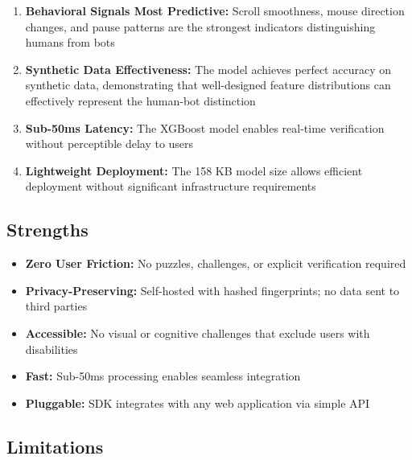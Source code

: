 \begin{enumerate}
    \item \textbf{Behavioral Signals Most Predictive:} Scroll smoothness, mouse direction changes, and pause patterns are the strongest indicators distinguishing humans from bots
    
    \item \textbf{Synthetic Data Effectiveness:} The model achieves perfect accuracy on synthetic data, demonstrating that well-designed feature distributions can effectively represent the human-bot distinction
    
    \item \textbf{Sub-50ms Latency:} The XGBoost model enables real-time verification without perceptible delay to users
    
    \item \textbf{Lightweight Deployment:} The 158 KB model size allows efficient deployment without significant infrastructure requirements
\end{enumerate}

\subsection{Strengths}

\begin{itemize}
    \item \textbf{Zero User Friction:} No puzzles, challenges, or explicit verification required
    \item \textbf{Privacy-Preserving:} Self-hosted with hashed fingerprints; no data sent to third parties
    \item \textbf{Accessible:} No visual or cognitive challenges that exclude users with disabilities
    \item \textbf{Fast:} Sub-50ms processing enables seamless integration
    \item \textbf{Pluggable:} SDK integrates with any web application via simple API
\end{itemize}

\subsection{Limitations}

